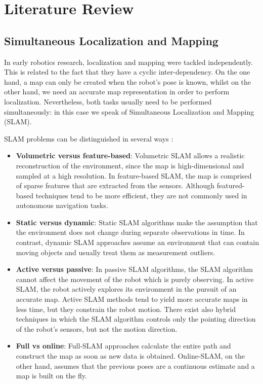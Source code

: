 \section{Literature Review}

\subsection{Simultaneous Localization and Mapping}

In early robotics research, localization and mapping were tackled
independently.
This is related to the fact that they have a cyclic inter-dependency.
On the one hand, a map can only be created when the robot’s pose is known,
whilst on the other hand, we need an accurate map representation in order to
perform localization.
Nevertheless, both tasks usually need to be performed simultaneously:
in this case we speak of Simultaneous Localization and Mapping (SLAM).

SLAM problems can be distinguished in several ways \parencite{Jefferies2008}:
\begin{itemize}
    \item \textbf{Volumetric versus feature-based}:
        Volumetric SLAM allows a realistic reconstruction of the environment,
        since the map is high-dimensional and sampled at a high resolution.
        In feature-based SLAM, the map is comprised of sparse features
        that are extracted from the sensors.
        Although featured-based techniques tend to be more efficient,
        they are not commonly used in autonomous navigation tasks.
    \item \textbf{Static versus dynamic}:
        Static SLAM algorithms make the assumption that the environment
        does not change during separate observations in time.
        In contrast, dynamic SLAM approaches assume an environment that
        can contain moving objects and usually treat them as
        measurement outliers.
    \item \textbf{Active versus passive}:
        In passive SLAM algorithms, the SLAM algorithm cannot affect the
        movement of the robot which is purely observing.
        In active SLAM, the robot actively explores its environment in
        the pursuit of an accurate map.
        Active SLAM methods tend to yield more accurate maps in less time,
        but they constrain the robot motion.
        There exist also hybrid techniques in which the SLAM algorithm
        controls only the pointing direction of the robot's sensors,
        but not the motion direction.
    \item \textbf{Full vs online}:
        Full-SLAM approaches calculate the entire path and construct the
        map as soon as new data is obtained.
        Online-SLAM, on the other hand, assumes that the previous poses are a
        continuous estimate and a map is built on the fly.
\end{itemize}

